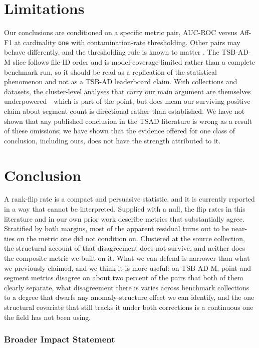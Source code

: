 \documentclass[twoside,11pt]{article}
\newcommand{\afff}{\mbox{Aff-F1}}
\newcommand{\auc}{\mbox{AUC-ROC}}
\begin{document}
\section{Limitations}

Our conclusions are conditioned on a specific metric pair, \auc{} versus \afff{}
at cardinality \texttt{one} with contamination-rate thresholding. Other pairs
may behave differently, and the thresholding rule is known to matter
\citep{masakuna2024impact}. The TSB-AD-M slice follows file-ID order and is
model-coverage-limited rather than a complete benchmark run, so it should be read
as a replication of the statistical phenomenon and not as a TSB-AD leaderboard
claim. With \TsbadCollections{} collections and \TabDatasets{} datasets, the
cluster-level analyses that carry our main argument are themselves
underpowered---which is part of the point, but does mean our surviving positive
claim about segment count is directional rather than established. We
have not shown that any published conclusion in the TSAD literature is wrong as
a result of these omissions; we have shown that the evidence offered for one
class of conclusion, including ours, does not have the strength attributed to it.

\section{Conclusion}

A rank-flip rate is a compact and persuasive statistic, and it is currently
reported in a way that cannot be interpreted. Supplied with a null, the flip
rates in this literature and in our own prior work describe metrics that
substantially agree. Stratified by both margins, most of the apparent residual
turns out to be near-ties on the metric one did not condition on. Clustered at
the source collection, the structural
account of that disagreement does not survive, and neither does the composite
metric we built on it. What we can defend is narrower than what we previously
claimed, and we think it is more useful: on TSB-AD-M, point and segment metrics
disagree on about two percent of the pairs that both of them clearly separate,
what disagreement there is varies
across benchmark collections to a degree that dwarfs any anomaly-structure
effect we can identify, and the one structural covariate that still tracks it
under both corrections is a continuous one the field has not been using.

\subsubsection*{Broader Impact Statement}
\end{document}
